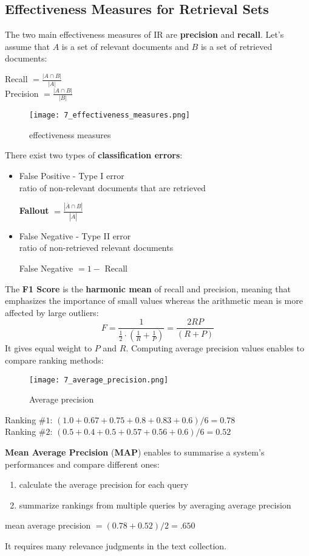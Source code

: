 \documentclass{article}
\begin{document}
\subsection{Effectiveness Measures for Retrieval Sets}
The two main effectiveness measures of IR are \textbf{precision} and \textbf{recall}.
Let's assume that $A$ is a set of relevant documents and $B$ is a set of retrieved documents:
\begin{center}
    Recall $= \displaystyle\frac{|A \cap B|}{|A|}$ \\
    Precision $= \displaystyle\frac{|A \cap B|}{|B|}$
\end{center}
\begin{figure}[H]
    \centering
    \texttt{[image: 7\_effectiveness\_measures.png]}
    \caption{effectiveness measures}
\end{figure}
There exist two types of \textbf{classification errors}:
\begin{itemize}
    \item False Positive - Type I error \\
    ratio of non-relevant documents that are retrieved
    \begin{center}
        \textbf{Fallout} $ = \displaystyle\frac{|\bar{A} \cap B|}{|\bar{A}|}$
    \end{center}
    \item False Negative - Type II error \\
    ratio of non-retrieved relevant documents
    \begin{center}
        False Negative $= 1 -$ Recall
    \end{center}
\end{itemize}
The \textbf{F1 Score} is the \textbf{harmonic mean} of recall and precision, meaning that emphasizes the importance of small values whereas the arithmetic mean is more affected by large outliers:
\[
    F = \displaystyle\frac{1}{\frac{1}{2} \cdot (\frac{1}{R} + \frac{1}{P})} = \frac{2RP}{(R + P)}
\]
It gives equal weight to $P$ and $R$.
Computing average precision values enables to compare ranking methods:
\begin{figure}[H]
    \centering
    \texttt{[image: 7\_average\_precision.png]}
    \caption{Average precision}
\end{figure}
\begin{center}
    Ranking $\#1$: $(1.0 + 0.67 + 0.75 + 0.8 + 0.83 + 0.6) / 6 = 0.78$ \\
    Ranking $\#2$: $(0.5 + 0.4 + 0.5 + 0.57 + 0.56 + 0.6) / 6 = 0.52 $
\end{center}
\textbf{Mean Average Precision} (\textbf{MAP}) enables to summarise a system's performances and compare different ones:
\begin{enumerate}
    \item calculate the average precision for each query
    \item summarize rankings from multiple queries by averaging average precision
\end{enumerate}
\begin{center}
    mean average precision $= (0.78 + 0.52) / 2 = .650 $
\end{center}
It requires many relevance judgments in the text collection.
\end{document}
